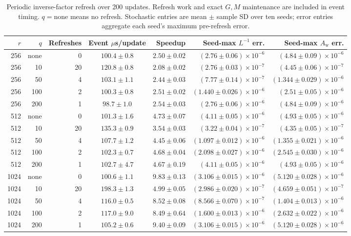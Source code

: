 \documentclass[11pt]{article}
\newcommand{\Aw}{A_{\mathrm w}}
\begin{document}
\begin{table}[ht]
\centering
\caption{Periodic inverse-factor refresh over 200 updates.  Refresh work and
exact \(G,M\) maintenance are included in event timing.  \(q=\mathrm{none}\)
means no refresh.  Stochastic entries are mean \(\pm\) sample SD over ten
seeds; error entries aggregate each seed's maximum pre-refresh error.}
\label{tab:e5-inverse-refresh}
{\scriptsize
\setlength{\tabcolsep}{1.5pt}
\begin{tabular}{@{}rrrcrrr@{}}
\toprule
\(r\) & \(q\) & Refreshes & Event \(\mu\)s/update & Speedup &
Seed-max \(L^{-1}\) err. & Seed-max \(\Aw\) err. \\
\midrule
256 & none & 0  & \(100.4\pm0.8\) & \(2.50\pm0.02\) &
  \((2.76\pm0.06)\times10^{-6}\) & \((4.84\pm0.09)\times10^{-6}\) \\
256 & 10   & 20 & \(120.8\pm0.8\) & \(2.08\pm0.02\) &
  \((2.76\pm0.03)\times10^{-7}\) & \((4.45\pm0.06)\times10^{-7}\) \\
256 & 50   & 4  & \(103.1\pm1.1\) & \(2.44\pm0.03\) &
  \((7.77\pm0.14)\times10^{-7}\) & \((1.344\pm0.029)\times10^{-6}\) \\
256 & 100  & 2  & \(100.3\pm0.8\) & \(2.51\pm0.02\) &
  \((1.440\pm0.026)\times10^{-6}\) & \((2.51\pm0.05)\times10^{-6}\) \\
256 & 200  & 1  & \(98.7\pm1.0\) & \(2.54\pm0.03\) &
  \((2.76\pm0.06)\times10^{-6}\) & \((4.84\pm0.09)\times10^{-6}\) \\
\midrule
512 & none & 0  & \(101.3\pm1.6\) & \(4.73\pm0.07\) &
  \((4.11\pm0.05)\times10^{-6}\) & \((4.93\pm0.05)\times10^{-6}\) \\
512 & 10   & 20 & \(135.3\pm0.9\) & \(3.54\pm0.03\) &
  \((3.22\pm0.04)\times10^{-7}\) & \((4.35\pm0.05)\times10^{-7}\) \\
512 & 50   & 4  & \(107.7\pm1.2\) & \(4.45\pm0.06\) &
  \((1.097\pm0.012)\times10^{-6}\) & \((1.355\pm0.021)\times10^{-6}\) \\
512 & 100  & 2  & \(102.3\pm0.7\) & \(4.68\pm0.04\) &
  \((2.098\pm0.027)\times10^{-6}\) & \((2.545\pm0.030)\times10^{-6}\) \\
512 & 200  & 1  & \(102.7\pm4.7\) & \(4.67\pm0.19\) &
  \((4.11\pm0.05)\times10^{-6}\) & \((4.93\pm0.05)\times10^{-6}\) \\
\midrule
1024 & none & 0  & \(100.6\pm1.1\) & \(9.83\pm0.13\) &
  \((3.106\pm0.015)\times10^{-6}\) & \((5.120\pm0.028)\times10^{-6}\) \\
1024 & 10   & 20 & \(198.3\pm1.3\) & \(4.99\pm0.05\) &
  \((2.986\pm0.020)\times10^{-7}\) & \((4.659\pm0.051)\times10^{-7}\) \\
1024 & 50   & 4  & \(116.0\pm0.5\) & \(8.52\pm0.08\) &
  \((8.566\pm0.070)\times10^{-7}\) & \((1.404\pm0.013)\times10^{-6}\) \\
1024 & 100  & 2  & \(117.0\pm9.0\) & \(8.49\pm0.64\) &
  \((1.600\pm0.013)\times10^{-6}\) & \((2.632\pm0.022)\times10^{-6}\) \\
1024 & 200  & 1  & \(105.2\pm0.6\) & \(9.40\pm0.09\) &
  \((3.106\pm0.015)\times10^{-6}\) & \((5.120\pm0.028)\times10^{-6}\) \\
\bottomrule
\end{tabular}
}
\end{table}
\end{document}
